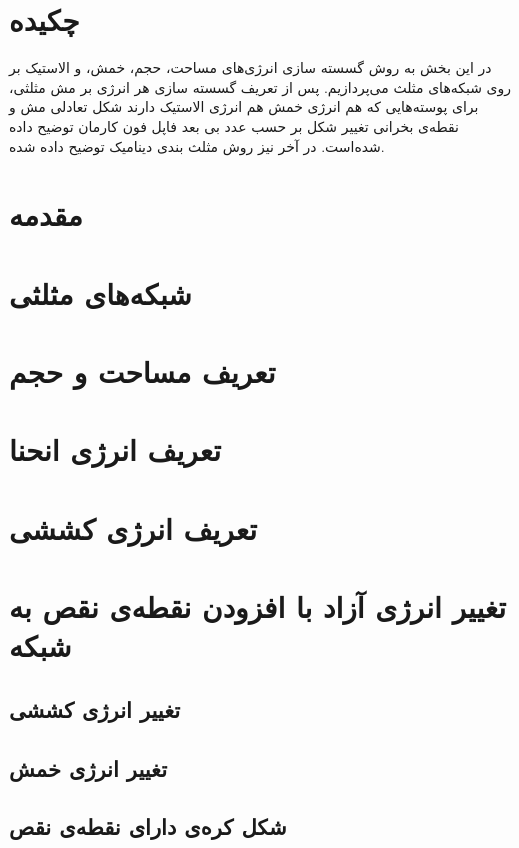 \setRL
\clearpage
\def \MemDiscr {\Mempath /MembraneDiscrete}

\section{
چکیده
}
در این بخش به روش گسسته سازی انرژی‌های مساحت، حجم، خمش، و الاستیک بر روی شبکه‌های مثلث می‌پردازیم. پس از تعریف گسسته سازی هر انرژی بر مش مثلثی، برای پوسته‌هایی که هم انرژی خمش هم انرژی الاستیک دارند شکل تعادلی مش  و نقطه‌ی بخرانی تغییر شکل بر حسب عدد بی بعد فاپل فون کارمان توضیح داده شده‌است. در آخر نیز روش مثلث بندی دینامیک توضیح داده شده. 



\section{
مقدمه
}



\section{
شبکه‌های مثلثی
}



\section{
تعریف مساحت و حجم
\label{sec:areaVolumeDiscr}
}



\section{\label{sec:curvatureDiscDef}
تعریف انرژی انحنا
}



\section{
تعریف انرژی کششی
\label{sec:youngMesh}
}


\section{
تغییر انرژی آزاد با افزودن نقطەی نقص به شبکه
}
\subsection{
تغییر انرژی کششی
}

\subsection{
تغییر انرژی خمش
}

\subsection{
شکل کره‌ی دارای نقطه‌ی نقص
\label{sec:gammaTransition}
}


%




